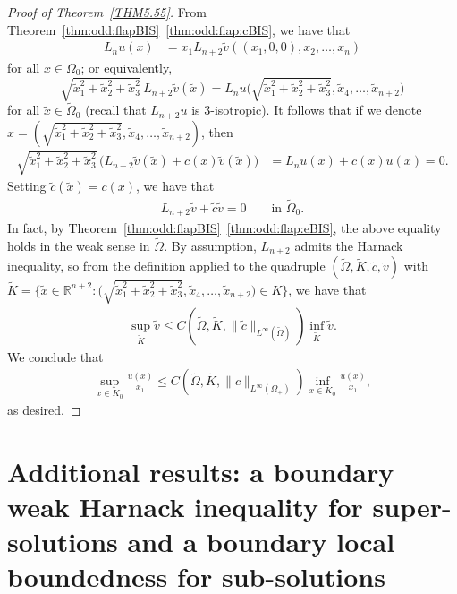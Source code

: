 \documentclass[a4paper,12pt,reqno]{amsart}
\numberwithin{equation}{section}
\theoremstyle{definition}
\theoremstyle{notation}
\newcommand{\R}{\mathds{R}}
\begin{document}
\begin{proof}[Proof of Theorem~\ref{THM5.55}]
From Theorem~\ref{thm:odd:flapBIS}~\ref{thm:odd:flap:cBIS}, we have that \begin{align*}
L_nu(x) &= x_1 L_{n+2}\tilde v((x_1, 0, 0), x_2, \ldots, x_n) 
\end{align*} for all \(x\in \Omega_0\); or equivalently, \begin{equation}\label{APIB}
\sqrt{\tilde x_1^2 + \tilde x_2^2 + \tilde x_3^2  } \, L_{n+2}\tilde v (\tilde x) = L_nu \Big (\sqrt{\tilde x_1^2 + \tilde x_2^2 + \tilde x_3^2}, \tilde x_4, \ldots, \tilde x_{n+2} \Big ) 
\end{equation} for all \(\tilde x \in \tilde \Omega_0\) (recall that $L_{n + 2} u$ is $3$-isotropic). It follows that if we denote $x = (\sqrt{\tilde x_1^2 + \tilde x_2^2 + \tilde x_3^2}, \tilde x_4, \ldots, \tilde x_{n+2})$, then \begin{align*}
\sqrt{\tilde x_1^2 + \tilde x_2^2 + \tilde x_3^2  } \, \big ( L_{n+2}\tilde v (\tilde x) + c(x) \tilde v (\tilde x) \big ) &=  L_nu(x)  + c(x) u(x)=0 .
\end{align*} Setting \(\tilde c (\tilde x) = c(x)\), we have that \begin{align*}
L_{n+2}\tilde v + \tilde c \tilde v = 0 \qquad \text{in } \tilde \Omega_0 . 
\end{align*} In fact, by Theorem~\ref{thm:odd:flapBIS}~\ref{thm:odd:flap:eBIS}, the above equality holds in the weak sense in $\tilde \Omega$. By assumption, \(L_{n+2}\) admits the Harnack inequality, so from the definition applied to the quadruple \((\tilde \Omega, \tilde K , \tilde c, \tilde v)\) with \(\tilde K = \big  \{\tilde x \in \R^{n + 2} : \big (\sqrt{\tilde x_1^2 + \tilde x_2^2 + \tilde x_3^2}, \tilde x_4, \ldots, \tilde x_{n + 2} \big ) \in K \big \}\), we have that \begin{align*}
\sup_{\tilde K } \tilde v \leq C(\tilde \Omega,\tilde K,\|\tilde c\|_{L^\infty(\tilde \Omega)}) \inf_{\tilde K} \tilde v .
\end{align*} We conclude that \begin{align*}
\sup_{ x\in K_0} \frac{u(x)}{x_1} \leq C(\tilde \Omega,\tilde K,\|c\|_{L^\infty(\Omega_+)}) \inf_{x\in K_0}  \frac{u(x) }{x_1} ,
\end{align*} as desired. 
\end{proof}


\section{Additional results: a boundary weak Harnack
inequality for super-solutions and a boundary local boundedness for sub-solutions}\label{sodjvlfORTYHSJDgh}
\end{document}
